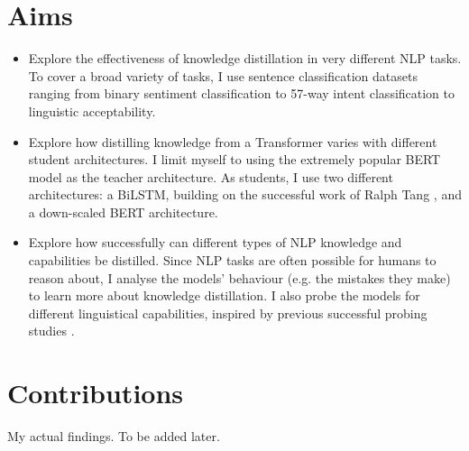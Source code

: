 \documentclass[bsc,frontabs,twoside,singlespacing,parskip,deptreport]{infthesis}
\begin{document}
{  \section{Aims}{
    \begin{itemize}
      \item Explore the effectiveness of knowledge distillation in very different NLP tasks. To cover a broad variety of tasks, I use sentence classification datasets ranging from binary sentiment classification to 57-way intent classification to linguistic acceptability.
      \item Explore how distilling knowledge from a Transformer varies with different student architectures. I limit myself to using the extremely popular BERT model \citep{Devlin_2018} as the teacher architecture. As students, I use two different architectures: a BiLSTM, building on the successful work of Ralph Tang \citep{Tang_2019a,Tang_2019b}, and a down-scaled BERT architecture.
      \item Explore how successfully can different types of NLP knowledge and capabilities be distilled. Since NLP tasks are often possible for humans to reason about, I analyse the models' behaviour (e.g. the mistakes they make) to learn more about knowledge distillation. I also probe the models for different linguistical capabilities, inspired by previous successful probing studies \citep{Conneau_2018,Tenney_2019b}.
    \end{itemize}
  }
  
  \section{Contributions}{
    My actual findings. To be added later.
  }
}
\end{document}
